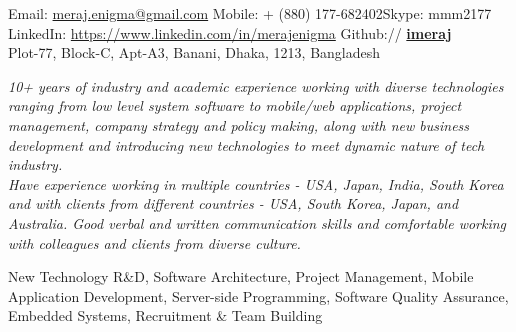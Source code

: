\documentclass[10pt,a4paper]{article} %
\begin{document}
 



\noindent Email: \href{mailto:meraj.enigma@gmail.com}{meraj.enigma@gmail.com}\bull %
\textsmaller Mobile: {+} (880) 177-682402\bull Skype: mmm2177 \\ %
LinkedIn: \href{https://www.linkedin.com/in/merajenigma}{https://www.linkedin.com/in/merajenigma} \bull  Github:// \href{https://github.com/imeraj}{\bf imeraj} \\%
 Plot-77, Block-C, Apt-A3, Banani, Dhaka, 1213, Bangladesh %

\spacedhrule{0.9em}{-0.4em} %



\vspace{-1.3em} %

\begin{multicols}{2}  %
\noindent \textit{10+ years of industry and academic experience working with diverse technologies ranging from low level system software to mobile/web applications, project management, company strategy and policy making, along with new business development and introducing new technologies to meet dynamic nature of tech industry.\\
Have experience working in multiple countries - USA, Japan, India, South Korea and with clients from different countries - USA, South Korea, Japan, and Australia. Good verbal and written communication skills and comfortable working with colleagues and clients from diverse culture.}
\end{multicols}

 New Technology R\&D, Software Architecture, Project Management, Mobile Application Development, Server-side Programming, Software Quality Assurance, Embedded Systems, Recruitment \& Team Building\\
\end{document}
